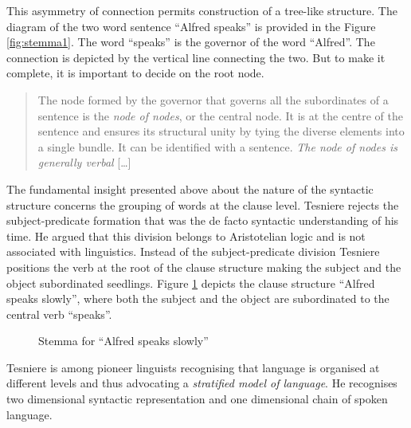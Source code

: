     This asymmetry of connection permits construction of a tree-like structure. The diagram of the two word sentence ``Alfred speaks'' is provided in the Figure \ref{fig:stemma1}. The word ``speaks'' is the governor of the word ``Alfred''. The connection is depicted by the vertical line connecting the two. But to make it complete, it is important to decide on the root node. 
    
    \begin{quotation}
        The node formed by the governor that governs all the subordinates of a sentence is the \textit{node of nodes}, or the central node. It is at the centre of the sentence and ensures its structural unity by tying the diverse elements into a single bundle. It can be identified with a sentence. \textit{The node of nodes is generally verbal} [\dots] \citep[7]{Tesniere2015}
    \end{quotation}

    The fundamental insight presented above about the nature of the syntactic structure concerns the grouping of words at the clause level. Tesniere rejects the subject-predicate formation that was the de facto syntactic understanding of his time. He argued that this division belongs to Aristotelian logic and is not associated with linguistics. Instead of the subject-predicate division Tesniere positions the verb at the root of the clause structure making the subject and the object subordinated seedlings. Figure \ref{fig:stemma2} depicts the clause structure ``Alfred speaks slowly'', where both the subject and the object are subordinated to the central verb ``speaks''. 
    
    \begin{figure}[!ht]
        \centering
        \caption{Stemma for ``Alfred speaks slowly''}
        \label{fig:stemma2}
    \end{figure}

    Tesniere is among pioneer linguists recognising that language is organised at different levels and thus advocating a \textit{stratified model of language}. He recognises two dimensional syntactic representation and one dimensional chain of spoken language. 
    
